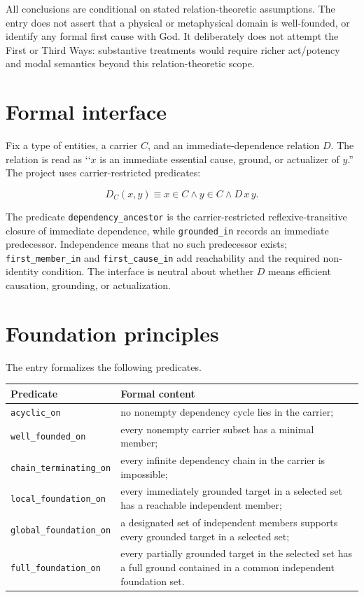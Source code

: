 \documentclass[11pt,a4paper]{article}
\begin{document}
All conclusions are conditional on stated relation-theoretic assumptions.  The
entry does not assert that a physical or metaphysical domain is well-founded,
or identify any formal first cause with God.  It deliberately does not attempt
the First or Third Ways: substantive treatments would require richer
act/potency and modal semantics beyond this relation-theoretic scope.

\section{Formal interface}

Fix a type of entities, a carrier \(C\), and an immediate-dependence relation
\(D\).  The relation is read as \lq\lq \(x\) is an immediate essential cause,
ground, or actualizer of \(y\).''  The project uses carrier-restricted
predicates:

\[
  D_C(x,y) \mathrel{\equiv} x\in C \land y\in C \land D\,x\,y.
\]

The predicate \texttt{dependency\_ancestor} is the carrier-restricted
reflexive-transitive closure of immediate dependence, while
\texttt{grounded\_in} records an immediate predecessor.  Independence means
that no such predecessor exists; \texttt{first\_member\_in} and
\texttt{first\_cause\_in} add reachability and the required non-identity
condition.  The interface is neutral about whether \(D\) means efficient
causation, grounding, or actualization.

\section{Foundation principles}

The entry formalizes the following predicates.

\begin{center}
\begin{tabular}{@{}p{.25\linewidth}p{.64\linewidth}@{}}
\toprule
\textbf{Predicate} & \textbf{Formal content} \\
\midrule
\texttt{acyclic\_on} & no nonempty dependency cycle lies in the carrier; \\
\texttt{well\_founded\_on} & every nonempty carrier subset has a minimal member; \\
\texttt{chain\_terminating\_on} & every infinite dependency chain in the carrier is impossible; \\
\texttt{local\_foundation\_on} & every immediately grounded target in a selected set has a reachable independent member; \\
\texttt{global\_foundation\_on} & a designated set of independent members supports every grounded target in a selected set; \\
\texttt{full\_foundation\_on} & every partially grounded target in the selected set has a full ground contained in a common independent foundation set. \\
\bottomrule
\end{tabular}
\end{center}
\end{document}
